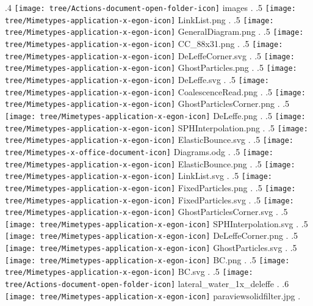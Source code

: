 {.4 { \texttt{[image: tree/Actions-document-open-folder-icon]} images }.
.5 { \texttt{[image: tree/Mimetypes-application-x-egon-icon]} LinkList.png }.
.5 { \texttt{[image: tree/Mimetypes-application-x-egon-icon]} GeneralDiagram.png }.
.5 { \texttt{[image: tree/Mimetypes-application-x-egon-icon]} CC\_88x31.png }.
.5 { \texttt{[image: tree/Mimetypes-application-x-egon-icon]} DeLeffeCorner.svg }.
.5 { \texttt{[image: tree/Mimetypes-application-x-egon-icon]} GhostParticles.png }.
.5 { \texttt{[image: tree/Mimetypes-application-x-egon-icon]} DeLeffe.svg }.
.5 { \texttt{[image: tree/Mimetypes-application-x-egon-icon]} CoalescenceRead.png }.
.5 { \texttt{[image: tree/Mimetypes-application-x-egon-icon]} GhostParticlesCorner.png }.
.5 { \texttt{[image: tree/Mimetypes-application-x-egon-icon]} DeLeffe.png }.
.5 { \texttt{[image: tree/Mimetypes-application-x-egon-icon]} SPHInterpolation.png }.
.5 { \texttt{[image: tree/Mimetypes-application-x-egon-icon]} ElasticBounce.svg }.
.5 { \texttt{[image: tree/Mimetypes-x-office-document-icon]} Diagrams.odg }.
.5 { \texttt{[image: tree/Mimetypes-application-x-egon-icon]} ElasticBounce.png }.
.5 { \texttt{[image: tree/Mimetypes-application-x-egon-icon]} LinkList.svg }.
.5 { \texttt{[image: tree/Mimetypes-application-x-egon-icon]} FixedParticles.png }.
.5 { \texttt{[image: tree/Mimetypes-application-x-egon-icon]} FixedParticles.svg }.
.5 { \texttt{[image: tree/Mimetypes-application-x-egon-icon]} GhostParticlesCorner.svg }.
.5 { \texttt{[image: tree/Mimetypes-application-x-egon-icon]} SPHInterpolation.svg }.
.5 { \texttt{[image: tree/Mimetypes-application-x-egon-icon]} DeLeffeCorner.png }.
.5 { \texttt{[image: tree/Mimetypes-application-x-egon-icon]} GhostParticles.svg }.
.5 { \texttt{[image: tree/Mimetypes-application-x-egon-icon]} BC.png }.
.5 { \texttt{[image: tree/Mimetypes-application-x-egon-icon]} BC.svg }.
.5 { \texttt{[image: tree/Actions-document-open-folder-icon]} lateral\_water\_1x\_deleffe }.
.6 { \texttt{[image: tree/Mimetypes-application-x-egon-icon]} paraviewsolidfilter.jpg }.
}
